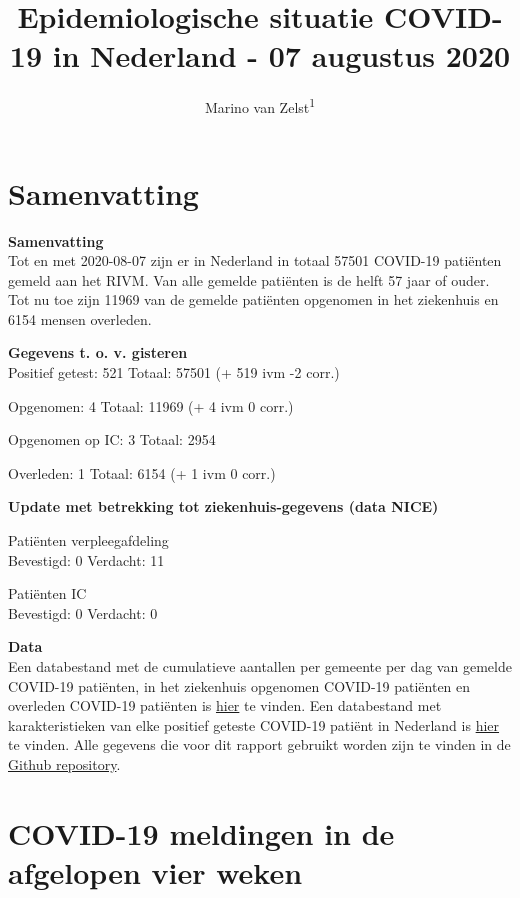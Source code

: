 \documentclass[
  english,
  man,floatsintext]{apa6}
\title{Epidemiologische situatie COVID-19 in Nederland - 07 augustus 2020}
\author{Marino van Zelst\textsuperscript{1}}
\date{}
\affiliation{\vspace{0.5cm}\textsuperscript{1} -}
\begin{document}
\maketitle

{
\hypersetup{linkcolor=}
\setcounter{tocdepth}{3}
\tableofcontents
}
\newpage

\hypertarget{samenvatting}{%
\section{Samenvatting}\label{samenvatting}}

\textbf{Samenvatting}\\
Tot en met 2020-08-07 zijn er in Nederland in totaal 57501 COVID-19 patiënten gemeld aan het RIVM. Van alle gemelde patiënten is de helft 57 jaar of ouder. Tot nu toe zijn 11969 van de gemelde patiënten opgenomen in het ziekenhuis en 6154 mensen overleden.

\textbf{Gegevens t. o. v. gisteren}\\
Positief getest: 521
Totaal: 57501 (+ 519 ivm -2 corr.)

Opgenomen: 4
Totaal: 11969 (+
4 ivm 0 corr.)

Opgenomen op IC: 3
Totaal: 2954

Overleden: 1
Totaal: 6154 (+
1 ivm 0 corr.)

\textbf{Update met betrekking tot ziekenhuis-gegevens (data NICE)}

Patiënten verpleegafdeling\\
Bevestigd: 0 Verdacht: 11

Patiënten IC\\
Bevestigd: 0 Verdacht: 0

\textbf{Data}\\
Een databestand met de cumulatieve aantallen per gemeente per dag van gemelde COVID-19 patiënten, in het ziekenhuis opgenomen COVID-19 patiënten en overleden COVID-19 patiënten is \href{https://data.rivm.nl/geonetwork/srv/dut/catalog.search\#/metadata/1c0fcd57-1102-4620-9cfa-441e93ea5604}{hier} te vinden. Een databestand met karakteristieken van elke positief geteste COVID-19 patiënt in Nederland is \href{https://data.rivm.nl/geonetwork/srv/dut/catalog.search\#/metadata/2c4357c8-76e4-4662-9574-1deb8a73f724?tab=relations}{hier} te vinden. Alle gegevens die voor dit rapport gebruikt worden zijn te vinden in de \href{https://github.com/mzelst/covid-19}{Github repository}.

\newpage

\hypertarget{covid-19-meldingen-in-de-afgelopen-vier-weken}{%
\section{COVID-19 meldingen in de afgelopen vier weken}\label{covid-19-meldingen-in-de-afgelopen-vier-weken}}
\end{document}
